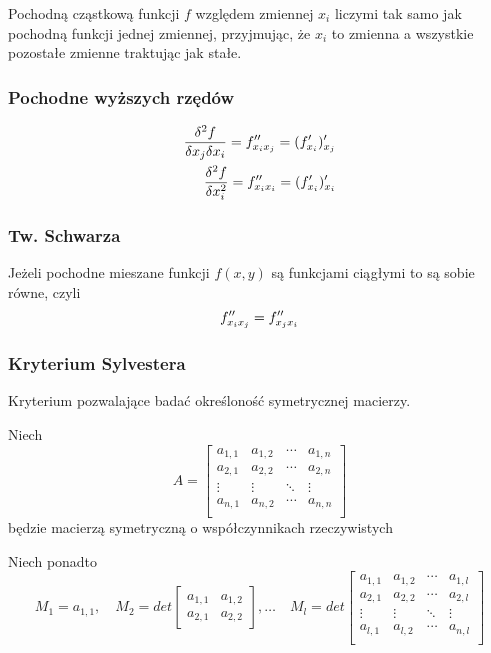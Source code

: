 \documentclass[../Matematyka.tex]{subfiles}
\begin{document}
    Pochodną cząstkową funkcji \(f\) względem zmiennej \(x_i\) liczymi tak samo jak pochodną funkcji jednej zmiennej, przyjmując, że \(x_i\) to zmienna a wszystkie pozostałe zmienne traktując jak stałe.

    \subsubsection*{Pochodne wyższych rzędów}
    \begin{align*}
        \frac{\delta^2f}{\delta x_j \delta x_i} = f^{\prime\prime}_{x_i x_j} = (f^\prime_{x_i})^\prime_{x_j} \\
        \frac{\delta^2f}{\delta x^2_i} = f^{\prime\prime}_{x_i x_i} = (f^\prime_{x_i})^\prime_{x_i}
    \end{align*}

    \subsubsection{Tw. Schwarza}
    Jeżeli pochodne mieszane funkcji \(f(x, y)\) są funkcjami ciągłymi to są sobie równe, czyli
    \[f^{\prime\prime}_{x_i x_j} = f^{\prime\prime}_{x_j x_i}\]

    \subsubsection{Kryterium Sylvestera}
    Kryterium pozwalające badać określoność symetrycznej macierzy.

    Niech
    \begin{displaymath}
        A = 
        \begin{bmatrix}
            a_{1,1} & a_{1,2} & \cdots & a_{1,n} \\
            a_{2,1} & a_{2,2} & \cdots & a_{2,n} \\
            \vdots & \vdots & \ddots & \vdots \\
            a_{n,1} & a_{n,2} & \cdots & a_{n,n} \\
        \end{bmatrix}
    \end{displaymath}
    będzie macierzą symetryczną o współczynnikach rzeczywistych

    Niech ponadto
    \begin{displaymath}
        M_1 = a_{1,1}, \quad 
        M_2 = det
        \begin{bmatrix}
            a_{1,1} & a_{1,2} \\
            a_{2,1} & a_{2,2}
        \end{bmatrix}, \dots \quad
        M_l = det
        \begin{bmatrix}
            a_{1,1} & a_{1,2} & \cdots & a_{1,l} \\
            a_{2,1} & a_{2,2} & \cdots & a_{2,l} \\
            \vdots & \vdots & \ddots & \vdots \\
            a_{l,1} & a_{l,2} & \cdots & a_{n,l} \\
        \end{bmatrix}
    \end{displaymath}
\end{document}
